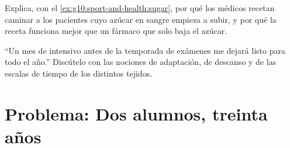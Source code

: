 \begin{exercise}[$\star\star\star$]\label{exo:g10:sport-and-health:14}
Explica, con el \cref{ex:g10:sport-and-health:sugar}, por qué los
médicos recetan caminar a los pacientes cuyo azúcar en sangre empieza a
subir, y por qué la receta funciona mejor que un fármaco que solo baja
el azúcar.
\end{exercise}

\begin{exercise}[$\star\star\star$]\label{exo:g10:sport-and-health:15}
``Un mes de  intensivo antes de la temporada de exámenes
me dejará listo para todo el año.'' Discútelo con las nociones de
adaptación, de descanso y de las escalas de tiempo de los distintos
tejidos.
\end{exercise}

\section{Problema: Dos alumnos, treinta años}

